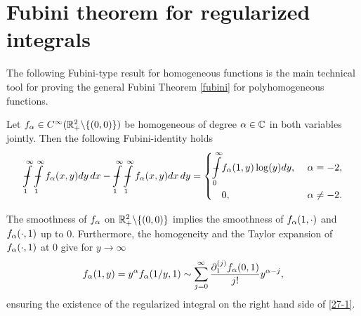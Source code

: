 \section{Fubini theorem for regularized integrals}
The following Fubini-type result for homogeneous functions is 
the main technical tool for proving the general Fubini Theorem \ref{fubini}
for polyhomogeneous functions.

\begin{theorem}
Let $f_{\mathrm{\alpha}}\in C^{\infty}(\mathbb{R}_+^2 \backslash \{(0,0)\})$ be homogeneous of degree $\mathrm{\alpha} \in \mathbb{C}$ in both variables jointly. Then the following Fubini-identity holds
\begin{equation}
\label{27-1}
\regint\limits_1^\infty \regint\limits_1^\infty f_{\A}(x,y) dy \, dx - 
\regint\limits_1^\infty \regint\limits_1^\infty f_{\A}(x,y) dx \, dy = 
\left\{
\begin{split}
\regint\limits_0^\infty &f_{\A}(1,y) \log(y) dy, \ &\A=-2, \\
&0, &\A\neq -2.
\end{split}
\right.
\end{equation}
\end{theorem}

\begin{remark}\label{reg-int-remark}
The smoothness of $f_{\mathrm{\alpha}}$ on $\mathbb{R}^2_+\backslash\{(0,0)\}$
implies the smoothness of $f_{\mathrm{\alpha}}(1,\cdot)$ and $f_{\mathrm{\alpha}}(\cdot, 1)$
up to $0$. Furthermore, the homogeneity and the Taylor expansion 
of $f_{\mathrm{\alpha}}(\cdot, 1)$ at $0$ give for $y \to \infty$
\begin{equation}
\label{27-2}
f_{\mathrm{\alpha}}(1,y)=y^{\mathrm{\alpha}} f_{\mathrm{\alpha}}(1/y,1)
\sim \sum_{j=0}^\infty \frac{\partial_1^{(j)}f_{\mathrm{\alpha}}(0,1)}{j!} y^{\mathrm{\alpha}-j},
\end{equation}
ensuring the existence of the regularized integral 
on the right hand side of \eqref{27-1}.
\end{remark}

